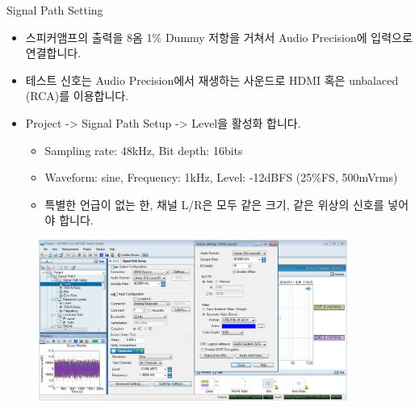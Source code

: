 \documentclass{beamer}
\begin{document}
	
	
	\begin{frame}[t]{Signal Path Setting}
		\begin{itemize}
			\item 스피커앰프의 출력을 8옴 1\% Dummy 저항을 거쳐서 Audio Precision에 입력으로 연결합니다.
			\item 테스트 신호는 Audio Precision에서 재생하는 사운드로 HDMI 혹은 unbalaced (RCA)를 이용합니다.
			\item Project -> Signal Path Setup -> Level을 활성화 합니다.
			\begin{itemize}
				\item Sampling rate: 48kHz, Bit depth: 16bits
				\item Waveform: sine, Frequency: 1kHz, Level: -12dBFS (25\%FS, 500mVrms)
				\item 특별한 언급이 없는 한, 채널 L/R은 모두 같은 크기, 같은 위상의 신호를 넣어야 합니다.
			\end{itemize}
		\end{itemize}
		
		\begin{figure}[b]
			\includegraphics[width=0.9\textwidth]{figure/apsetting/signalPath.png}
		\end{figure}
		
	\end{frame}
	
\end{document}
